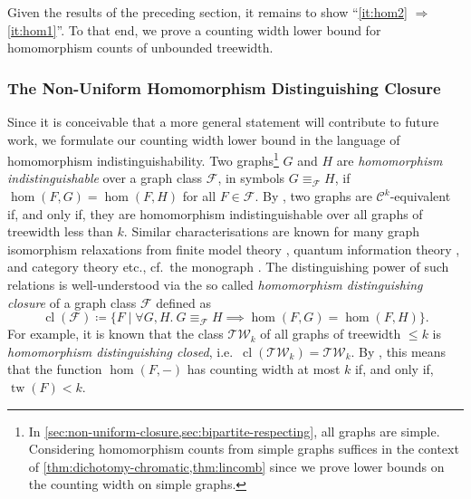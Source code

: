 \documentclass[10pt,a4paper]{article}
\theoremstyle{definition}
\theoremstyle{plain}
\theoremstyle{remark}
\DeclareMathOperator{\tw}{tw}
\DeclareMathOperator{\cl}{cl}
\begin{document}
	Given the results of the preceding section,  it remains to show \enquote{\ref{it:hom2} $\Rightarrow$ \ref{it:hom1}}.
	To that end, 
	we prove a counting width lower bound for homomorphism counts of unbounded treewidth.
	
	
	\subsubsection{The Non-Uniform Homomorphism Distinguishing Closure}
	\label{sec:non-uniform-closure}
	
	Since it is conceivable that a more general statement will contribute to future work,
	we formulate our counting width lower bound in the language of homomorphism indistinguishability.
	Two graphs\footnote{In \cref{sec:non-uniform-closure,sec:bipartite-respecting}, all graphs are simple. 
		Considering homomorphism counts from simple graphs suffices in the context of 
		 \cref{thm:dichotomy-chromatic,thm:lincomb} since we prove lower bounds on the counting width on simple graphs.} $G$ and $H$ are \emph{homomorphism indistinguishable} over a graph class $\mathcal{F}$, in symbols $G \equiv_{\mathcal{F}} H$,
	if $\hom(F, G) = \hom(F, H)$ for all $F \in \mathcal{F}$.
	By \cite{dvorak_recognizing_2010,dell-grohe-rattan},
	two graphs are $\mathcal{C}^k$-equivalent
	if, and only if,
	they are homomorphism indistinguishable over all graphs of treewidth less than $k$.
	Similar characterisations are known for many graph isomorphism relaxations from finite model theory \cite{grohe_counting_2020,fluck_going_2024}, quantum information theory \cite{mancinska_quantum_2020}, and category theory \cite{dawar_lovasz-type_2021,montacute_pebble-relation_2024} etc.,
	cf.\ the monograph \cite{seppelt_homomorphism_2024}.
	The distinguishing power of such relations is well-understood via the so called \emph{homomorphism distinguishing closure} \cite{roberson_oddomorphisms_2022} of a graph class $\mathcal{F}$ defined as
	\[
		\cl(\mathcal{F}) \coloneqq \{F \mid \forall G, H.\ G \equiv_{\mathcal{F}} H \implies \hom(F, G) = \hom(F, H)\}.
	\]
	For example, it is known \cite{neuen_homomorphism-distinguishing_2024} that the class  $\mathcal{TW}_k$ of all graphs of treewidth $\leq k$ is \emph{homomorphism distinguishing closed}, i.e.\ $\cl(\mathcal{TW}_k) = \mathcal{TW}_k$.
	By \cite{dvorak_recognizing_2010},
	this means that the function $\hom(F, -)$ has counting width 
	at most $k$ if, and only if, $\tw(F) < k$.
	
\end{document}
